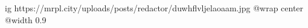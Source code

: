  
 
 
 
 

\ifcmt
  ig https://mrpl.city/uploads/posts/redactor/duwhflvljelaoaam.jpg
  @wrap center
  @width 0.9
\fi
